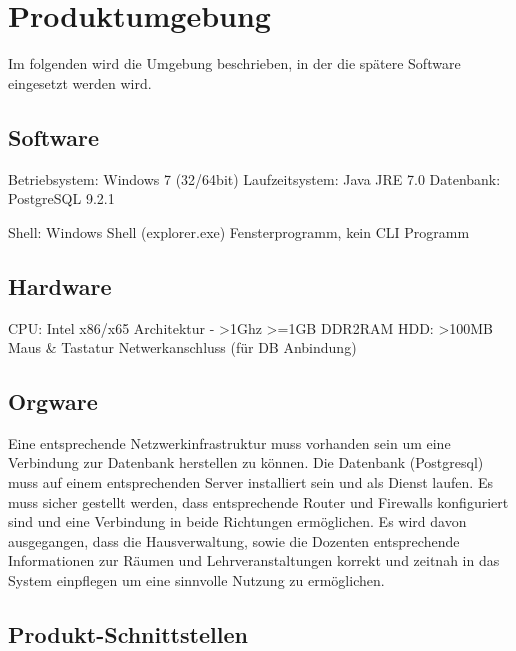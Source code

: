 \section{Produktumgebung}
\label{sec:Produktumgebung}

Im folgenden wird die Umgebung beschrieben, in der die spätere Software eingesetzt werden wird.

\subsection{Software}
Betriebsystem: Windows 7 (32/64bit)
Laufzeitsystem: Java JRE 7.0
Datenbank: PostgreSQL 9.2.1

Shell: Windows Shell (explorer.exe) Fensterprogramm, kein CLI Programm


\subsection{Hardware}
CPU: Intel x86/x65 Architektur - >1Ghz
>=1GB DDR2RAM
HDD: >100MB
Maus \& Tastatur
Netwerkanschluss (für DB Anbindung)

\subsection{Orgware}
Eine entsprechende Netzwerkinfrastruktur muss vorhanden sein um eine Verbindung zur Datenbank herstellen zu können.
Die Datenbank (Postgresql) muss auf einem entsprechenden Server installiert sein und als Dienst laufen. Es muss sicher gestellt werden, dass entsprechende Router und Firewalls konfiguriert sind und eine Verbindung in beide Richtungen ermöglichen.
Es wird davon ausgegangen, dass die Hausverwaltung, sowie die Dozenten entsprechende Informationen zur Räumen und Lehrveranstaltungen korrekt und zeitnah in das System einpflegen um eine sinnvolle Nutzung zu ermöglichen.

\subsection{Produkt-Schnittstellen}
